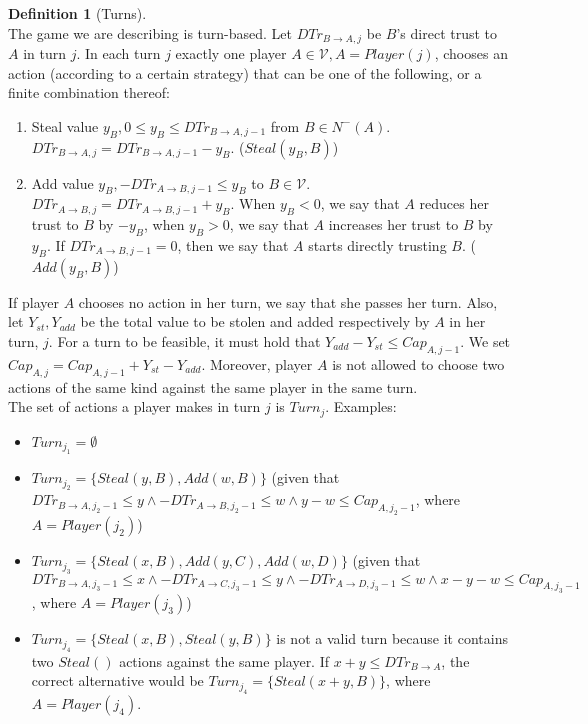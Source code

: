 \documentclass[11pt]{article}
\theoremstyle{definition}
\newtheorem{definition}{Definition}[section]
\theoremstyle{corollary}
\theoremstyle{lemma}
\begin{document}
     \begin{definition}[Turns] \ \\
        The game we are describing is turn-based. Let $DTr_{B \rightarrow A, j}$ be $B$'s direct trust to $A$ in turn $j$.
        In each turn $j$ exactly one player $A \in \mathcal{V}, A = Player(j)$, chooses an action (according to a certain
        strategy) that can be one of the following, or a finite combination thereof:
        \begin{enumerate}
           \item Steal value $y_B, 0 \leq y_B \leq DTr_{B \rightarrow A, j-1}$ from $B \in N^{-}(A)$.
           $DTr_{B \rightarrow A, j} = DTr_{B \rightarrow A, j-1} - y_B$. ($Steal(y_B, B)$)
           \item Add value $y_B, -DTr_{A \rightarrow B, j-1} \leq y_B$ to $B \in \mathcal{V}$.
           $DTr_{A \rightarrow B, j} = DTr_{A \rightarrow B, j-1} + y_B$. When $y_B < 0$, we say that $A$ reduces her trust
           to $B$ by $-y_B$, when $y_B > 0$, we say that $A$ increases her trust to $B$ by $y_B$.
           If $DTr_{A \rightarrow B, j-1} = 0$, then we say that $A$ starts directly trusting $B$. ($Add(y_B, B)$)
        \end{enumerate}
        If player $A$ chooses no action in her turn, we say that she passes her turn. Also, let $Y_{st}, Y_{add}$ be the
        total value to be stolen and added respectively by $A$ in her turn, $j$. For a turn to be feasible, it must hold
        that $Y_{add} - Y_{st} \leq Cap_{A, j-1}$. We set $Cap_{A, j} = Cap_{A, j-1} + Y_{st} - Y_{add}$. Moreover, player
        $A$ is not allowed to choose two actions of the same kind against the same player in the same turn. \\
        The set of actions a player makes in turn $j$ is $Turn_j$. Examples:
        \begin{itemize}
           \item $Turn_{j_1} = \emptyset$
           \item $Turn_{j_2} = \{Steal(y, B), Add(w, B)\}$ (given that $DTr_{B \rightarrow A, j_2 - 1} \leq y \wedge
           -DTr_{A \rightarrow B, j_2 - 1} \leq w \wedge y - w \leq Cap_{A, j_2-1}$, where $A = Player(j_2)$)
           \item $Turn_{j_3} = \{Steal(x, B), Add(y, C), Add(w, D)\}$ (given that $DTr_{B \rightarrow A, j_3 - 1} \leq x
           \wedge -DTr_{A \rightarrow C, j_3-1} \leq y \wedge -DTr_{A \rightarrow D, j_3 - 1} \leq w \wedge
           x - y - w \leq Cap_{A, j_3-1}$, where $A = Player(j_3)$)
           \item $Turn_{j_4} = \{Steal(x, B), Steal(y, B)\}$ is not a valid turn because it contains two $Steal()$ actions
           against the same player. If $x + y \leq DTr_{B \rightarrow A}$, the correct alternative would be $Turn_{j_4} =
           \{Steal(x+y, B)\}$, where $A = Player(j_4)$.
        \end{itemize}
     \end{definition}
\end{document}
